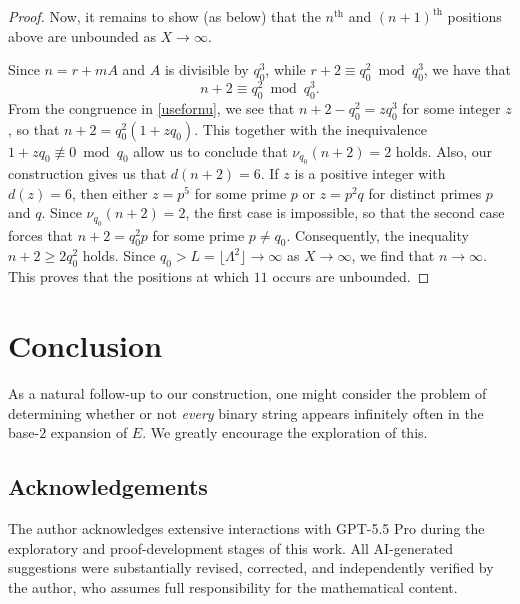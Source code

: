 \documentclass[12pt]{article}
\begin{document}
\begin{proof}
 Now, it remains to show (as below) that the $n^{\text{th}}$ and $(n+1)^{\text{th}}$ positions above
 are unbounded as $X \to \infty$. 

 Since $n = r + m A$ and $A$ is divisible by $q_0^3$, while $r + 2 \equiv q_0^2 \bmod q_0^3$, we have that 
\begin{equation}\label{usefornu}
 n + 2 \equiv q_0^2 \bmod q_0^3. 
\end{equation}
 From the congruence in \eqref{usefornu}, we see that $n + 2 - q_0^2 = z q_0^3 $ for some integer $z$, so that $ n + 2 = q_0^2(1 + 
 z q_0)$. This together with the inequivalence $1 + z q_0 \not\equiv 0 \bmod q_0$ allow us to conclude that $\nu_{q_0}(n+2)=2$ holds. 
 Also, our construction gives us that $d(n + 2) =6$. If $z$ is a positive integer with $d(z) = 6$, then either $z = p^5$ for some prime $p$ 
 or $z = p^2 q$ for distinct primes $p$ and $q$. Since $\nu_{q_{0}}(n+2)=2$, the first case is impossible, so that the second case forces that 
 $n + 2 = q_0^2 p$ for some prime $p \neq q_0$. Consequently, the inequality $n + 2 \geq 2 q_0^2$ holds. Since $q_0 > L = \lfloor 
 \Lambda^2 \rfloor \to \infty$ as $X \to \infty$, we find that $n \to \infty$. This proves that the positions at which $11$ occurs 
 are unbounded. 
\end{proof}

\section{Conclusion}
 As a natural follow-up to our construction, one might consider the problem of determining whether or not \emph{every} binary string 
 appears infinitely often in the base-$2$ expansion of $E$. We greatly encourage the exploration of this. 

\subsection*{Acknowledgements}
The author acknowledges extensive interactions with 
 GPT-5.5 Pro during the exploratory and proof-development stages of this work. All AI-generated suggestions were substantially revised, corrected, and independently verified by the author, who assumes full responsibility for the mathematical content.
\end{document}
